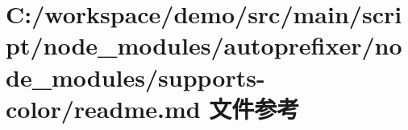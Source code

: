 \hypertarget{node__modules_2autoprefixer_2node__modules_2supports-color_2_r_e_a_d_m_e_8md}{}\section{C\+:/workspace/demo/src/main/script/node\+\_\+modules/autoprefixer/node\+\_\+modules/supports-\/color/readme.md 文件参考}
\label{node__modules_2autoprefixer_2node__modules_2supports-color_2_r_e_a_d_m_e_8md}
